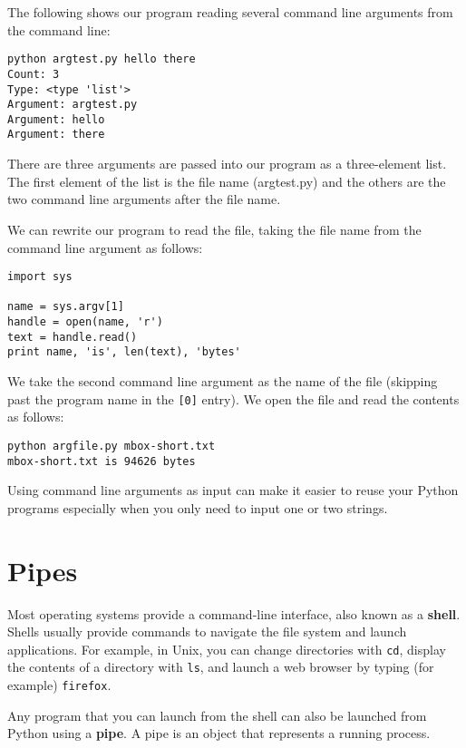 The following shows our program reading several command line arguments from the command
line:

\beforeverb
\begin{verbatim}
python argtest.py hello there
Count: 3
Type: <type 'list'>
Argument: argtest.py
Argument: hello
Argument: there
\end{verbatim}
\afterverb
%
There are three arguments are passed into our program as a three-element list.  
The first element of the list is the file name (argtest.py) and the others are 
the two command line arguments after the file name.

We can rewrite our program to read the file, taking the file name 
from the command line argument as follows:

\beforeverb
\begin{verbatim}
import sys

name = sys.argv[1]
handle = open(name, 'r')
text = handle.read()
print name, 'is', len(text), 'bytes'
\end{verbatim}
\afterverb
%
We take the second command line argument as the name of the file (skipping past
the program name in the {\tt [0]} entry).  We open the file and read 
the contents as follows:

\beforeverb
\begin{verbatim}
python argfile.py mbox-short.txt
mbox-short.txt is 94626 bytes
\end{verbatim}
\afterverb
%
Using command line arguments as input can make it easier to reuse your Python programs 
especially when you only need to input one or two strings.

\section{Pipes}


Most operating systems provide a command-line interface,
also known as a {\bf shell}.  Shells usually provide commands
to navigate the file system and launch applications.  For
example, in Unix, you can change directories with {\tt cd},
display the contents of a directory with {\tt ls}, and launch
a web browser by typing (for example) {\tt firefox}.


Any program that you can launch from the shell can also be
launched from Python using a {\bf pipe}.  A pipe is an object
that represents a running process.

